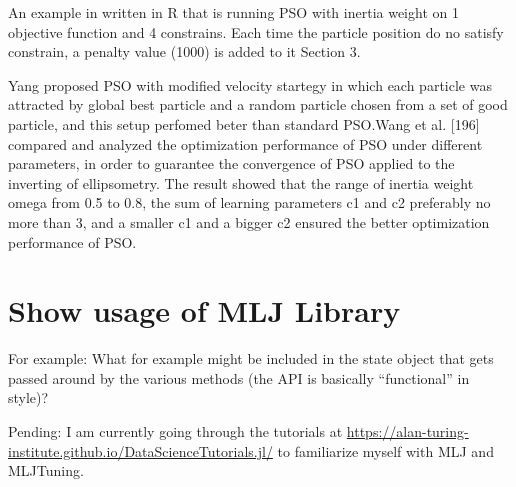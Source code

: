 \documentclass{article}
\begin{document}
An example in written in R that is running PSO with inertia weight on 1 objective function and 4 constrains. Each time the particle position do no satisfy constrain, a penalty value (1000) is added to it \cite{irfan_2021} Section 3.

Yang \cite{yang2011particle} proposed PSO with modified velocity startegy in which each particle was attracted by global best particle and a random particle chosen from a set of good particle, and this setup perfomed beter than standard PSO.Wang et al. [196] compared and analyzed the optimization performance of PSO under different parameters, in order to guarantee the convergence of PSO applied to the inverting of ellipsometry. The result showed that the range of inertia weight omega from 0.5 to 0.8, the sum of learning parameters c1 and c2 preferably no more than 3, and a smaller c1 and a bigger c2 ensured the better optimization performance of PSO.


\section{Show usage of MLJ Library}
For example: What for example might be included in the state object that gets passed around by the various methods (the API is basically “functional” in style)?

Pending: I am currently going through the tutorials at \url{https://alan-turing-institute.github.io/DataScienceTutorials.jl/}
 to familiarize myself with MLJ and MLJTuning.

\pagebreak

\printbibliography
\end{document}

